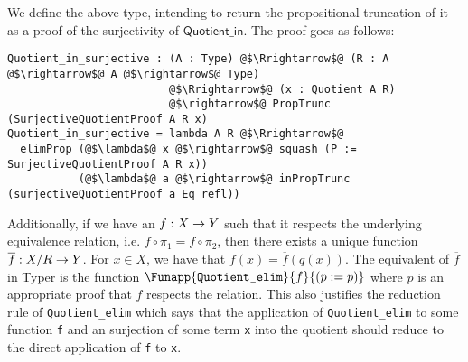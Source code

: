 \documentclass[12pt,twoside,maitrise]{dms}
\theoremstyle{definition}
\numberwithin{equation}{section}
\numberwithin{table}{chapter}
\numberwithin{figure}{chapter}
\newcommand\kw[1] {\textsf{#1}}
\newcommand\id[1] {\texttt{#1}}
\begin{document}
We define the above type, intending to return the propositional truncation of it as a proof of the surjectivity of $\kw{Quotient\_in}$. The proof goes as follows:

\begin{verbatim}
Quotient_in_surjective : (A : Type) @$\Rrightarrow$@ (R : A @$\rightarrow$@ A @$\rightarrow$@ Type)
                         @$\Rrightarrow$@ (x : Quotient A R)
                         @$\rightarrow$@ PropTrunc (SurjectiveQuotientProof A R x)
Quotient_in_surjective = lambda A R @$\Rrightarrow$@
  elimProp (@$\lambda$@ x @$\rightarrow$@ squash (P := SurjectiveQuotientProof A R x))
           (@$\lambda$@ a @$\rightarrow$@ inPropTrunc (surjectiveQuotientProof a Eq_refl))
\end{verbatim}

Additionally, if we have an $\oftype{f}{X \rightarrow Y}$ such that it respects
the underlying equivalence relation, i.e. $f \circ \pi_1 = f \circ \pi_2$, then
there exists a unique function $\oftype{\overline{f}}{X/R \rightarrow Y}$. For
$x \in X$, we have that $f(x) = \overline{f}(q(x))$. The equivalent of
$\overline{f}$ in Typer is the function
$\Funapp{\id{Quotient\_elim}}{f}{(\earg{p}{p})}$ where $p$ is an appropriate
proof that $f$ respects the relation. This also justifies the reduction rule of
\id{Quotient\_elim} which says that the application of \id{Quotient\_elim} to
some function \id{f} and an surjection of some term \id{x} into the quotient
should reduce to the direct application of \id{f} to \id{x}.
\end{document}
